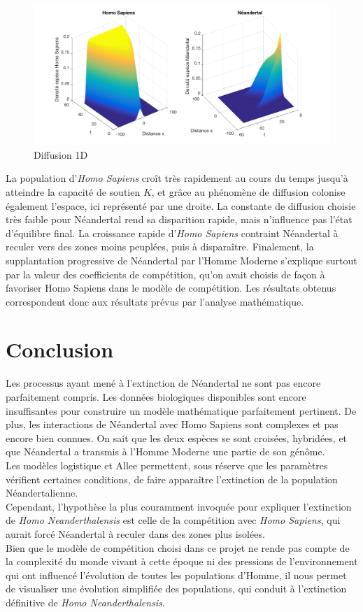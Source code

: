 \documentclass[a4paper,11pt]{article}
\begin{document}
\begin{figure}[H]
\centering
\includegraphics[scale=0.3]{Comp/CompDiff2.png}
\caption{Diffusion 1D}
\end{figure}

La population d'\textit{Homo Sapiens} croît très rapidement au cours du temps jusqu'à atteindre la capacité de soutien $K$, et grâce au phénomène de diffusion colonise également l'espace, ici représenté par une droite. La constante de diffusion choisie très faible pour Néandertal rend sa disparition rapide, mais n'influence pas l'état d'équilibre final. La croissance rapide d'\textit{Homo Sapiens} contraint Néandertal à reculer vers des zones moins peuplées, puis à disparaître.
Finalement, la supplantation progressive de Néandertal par l'Homme Moderne s'explique surtout par la valeur des coefficients de compétition, qu'on avait choisis de façon à favoriser Homo Sapiens dans le modèle de compétition. Les résultats obtenus correspondent donc aux résultats prévus par l'analyse mathématique.

\section{Conclusion}

Les processus ayant mené à l'extinction de Néandertal ne sont pas encore parfaitement compris. Les données biologiques disponibles sont encore insuffisantes pour construire un modèle mathématique parfaitement pertinent.
De plus, les interactions de Néandertal avec Homo Sapiens sont complexes et pas encore bien connues. On sait que les deux espèces se sont croisées, hybridées, et que Néandertal a transmis à l'Homme Moderne une partie de son génôme.\\
Les modèles logistique et Allee permettent, sous réserve que les paramètres vérifient certaines conditions, de faire apparaître l'extinction de la population Néandertalienne. \\
Cependant, l'hypothèse la plus couramment invoquée pour expliquer l'extinction de \textit{Homo Neanderthalensis} est celle de la compétition avec \textit{Homo Sapiens}, qui aurait forcé Néandertal à reculer dans des zones plus isolées.\\
Bien que le modèle de compétition choisi dans ce projet ne rende pas compte de la complexité du monde vivant à cette époque ni des pressions de l'environnement qui ont influencé l'évolution de toutes les populations d'Homme, il nous permet de visualiser une évolution simplifiée des populations, qui conduit à l'extinction définitive de \textit{Homo Neanderthalensis}.
\end{document}
